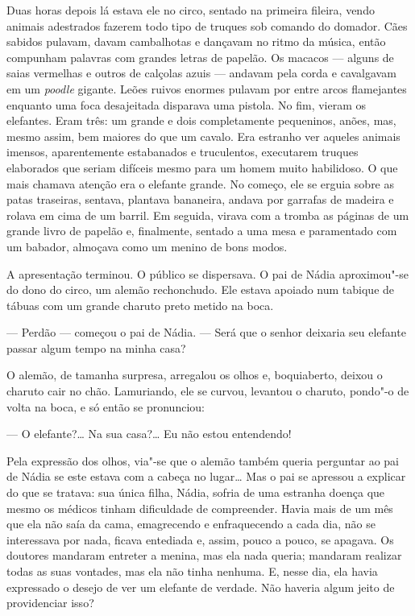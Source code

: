 Duas horas depois lá estava ele no circo, sentado na primeira fileira,
vendo animais adestrados fazerem todo tipo de truques sob comando do
domador. Cães sabidos pulavam, davam cambalhotas e dançavam no ritmo da
música, então compunham palavras com grandes letras de papelão. Os
macacos --- alguns de saias vermelhas e outros de calçolas azuis ---
andavam pela corda e cavalgavam em um \emph{poodle} gigante. Leões
ruivos enormes pulavam por entre arcos flamejantes enquanto uma foca
desajeitada disparava uma pistola. No fim, vieram os elefantes. Eram
três: um grande e dois completamente pequeninos, anões, mas, mesmo
assim, bem maiores do que um cavalo. Era estranho ver aqueles animais
imensos, aparentemente estabanados e truculentos, executarem truques elaborados que seriam difíceis mesmo para um homem muito
habilidoso. O que mais chamava atenção era o elefante grande. No
começo, ele se erguia sobre as patas traseiras, sentava, plantava
bananeira, andava por garrafas de madeira e rolava em cima de um
barril. Em seguida, virava com a tromba as páginas de um grande livro de
papelão e, finalmente, sentado a uma mesa e paramentado com um babador,
almoçava como um menino de bons modos.

A apresentação terminou. O público se dispersava. O pai de Nádia
aproximou"-se do dono do circo, um alemão rechonchudo. Ele estava apoiado
num tabique de tábuas com um grande charuto preto metido na boca.

--- Perdão --- começou o pai de Nádia. --- Será que o senhor deixaria
seu elefante passar algum tempo na minha casa?

O alemão, de tamanha surpresa, arregalou os olhos e, boquiaberto, deixou
o charuto cair no chão. Lamuriando, ele se curvou, levantou o charuto,
pondo"-o de volta na boca, e só então se pronunciou:

--- O elefante?\ldots{} Na sua casa?\ldots{} Eu não estou entendendo!

Pela expressão dos olhos, via"-se que o alemão também queria perguntar ao
pai de Nádia se este estava com a cabeça no lugar\ldots{} Mas o pai se
apressou a explicar do que se tratava: sua única filha, Nádia, sofria de
uma estranha doença que mesmo os médicos tinham dificuldade de
compreender. Havia mais de um mês que ela não saía da cama, emagrecendo
e enfraquecendo a cada dia, não se interessava por nada, ficava
entediada e, assim, pouco a pouco, se apagava. Os doutores mandaram
entreter a menina, mas ela nada queria; mandaram realizar todas as suas
vontades, mas ela não tinha nenhuma. E, nesse dia, ela havia expressado
o desejo de ver um elefante de verdade. Não haveria algum jeito de
providenciar isso?

